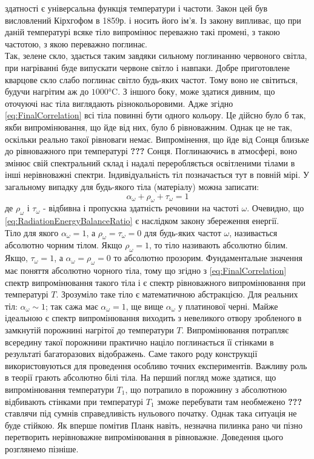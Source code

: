 \documentclass{article}
\begin{document}
здатності є універсальна функція температури і частоти. Закон цей був висловлений Кірхгофом в 1859р. і носить його ім'я. Із закону випливає, що 
при даній температурі всяке тіло випромінює переважно такі промені, з такою частотою, з якою переважно поглинає. \\
Так, зелене скло, здається таким завдяки сильному поглинанню червоного світла, при нагріванні буде випускати червоне світло і навпаки. Добре 
приготовлене кварцове скло слабо поглинає світло будь-яких частот. Тому воно не світиться, будучи нагрітим аж до $1000\si{\celsius}$. З іншого боку, 
може здатися дивним, що оточуючі нас тіла виглядають різнокольоровими. Адже згідно \eqref{eq:FinalCorrelation} всі тіла повинні бути одного кольору. 
Це дійсно було б так, якби випромінювання, що йде від них, було б рівноважним. Однак це не так, оскільки реально такої рівноваги немає. Випромінення, 
що йде від Сонця близьке до рівноважного при температурі \textbf{???} Сонця. Поглинаючись в атмосфері, воно змінює свій спектральний склад і надалі 
переробляється освітленими тілами в інші нерівноважні спектри. Індивідуальність тіл позначається тут в повній мірі. У загальному випадку для будь-якого 
тіла (матеріалу) можна записати:
\begin{equation}
    \label{eq:RadiationEnergyBalanceRatio}
    \alpha_{\omega} + \rho_{\omega} + \tau_{\omega} = 1
\end{equation}
де $\rho_{\omega}$ і $\tau_{\omega}$ - відбивна і пропускна здатність речовини на частоті $\omega$. Очевидно, що \eqref{eq:RadiationEnergyBalanceRatio} є 
наслідком закону збереження енергії. \\
Тіло для якого $\alpha_{\omega} = 1$, а $\rho_{\omega} = \tau_{\omega} = 0$ для будь-яких частот $\omega$, називається абсолютно чорним тілом. Якщо $\rho_{\omega} = 1$, 
то тіло називають абсолютно білим. Якщо, $\tau_{\omega} = 1$, а $\alpha_{\omega} = \rho_{\omega} = 0$ то абсолютно прозорим. Фундаментальне значення має поняття абсолютно 
чорного тіла, тому що згідно з \eqref{eq:FinalCorrelation} спектр випромінювання такого тіла і є спектр рівноважного випромінювання при температурі $T$. Зрозуміло таке 
тіло є математичною абстракцією. Для реальних тіл: $\alpha_{\omega} \sim 1$; так сажа має $\alpha_{\omega} = 1$, ще вище $\alpha_{\omega}$ у платинової черні. Майже ідеальною 
є спектр випромінювання виходить з невеликого отвору зробленого в замкнутій порожнині нагрітої до температури $T$. Випромінювання потрапляє всередину такої порожнини практично 
націло поглинається її стінками в результаті багаторазових відображень. Саме такого роду конструкції використовуються для проведення особливо точних експериментів. Важливу роль 
в теорії грають абсолютно білі тіла. На перший погляд може здатися, що випромінювання температури $T_{1}$, що потрапило в порожнину з абсолютною відбивають стінками при температурі 
$T_{1}$ зможе перебувати там необмежено \textbf{???} ставлячи під сумнів справедливість нульового початку. Однак така ситуація не буде стійкою. Як вперше помітив Планк навіть, 
незначна пилинка рано чи пізно перетворить нерівноважне випромінювання в рівноважне. Доведення цього розглянемо пізніше.
\end{document}
